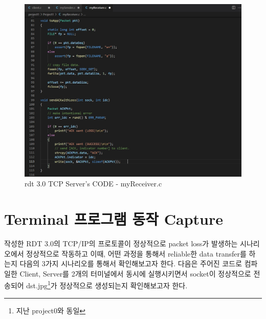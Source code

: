 \vspace{0mm}
	\begin{figure}[!h]
		\centering
			\includegraphics[width=.9\textwidth]{image/code2-2.jpg}
			\caption{rdt 3.0 TCP Server's CODE - myReceiver.c}
	\end{figure}
\vspace{-4mm}

	\section*{Terminal 프로그램 동작 Capture}
	작성한 RDT 3.0의 TCP/IP의 프로토콜이 정상적으로 packet loss가 발생하는 시나리오에서 정상적으로 작동하고 이때, 
	어떤 과정을 통해서 reliable한 data transfer를 하는지 다음의 3가지 시나리오를 통해서 확인해보고자 한다. 다음은 
	주어진 코드로 컴파일한 Client, Server를 2개의 터미널에서 동시에 실행시키면서 socket이 정상적으로 전송되어 
	dst.jpg\footnote{지난 project0와 동일}가 정상적으로 생성되는지 확인해보고자 한다.
	\vspace{-4mm}
